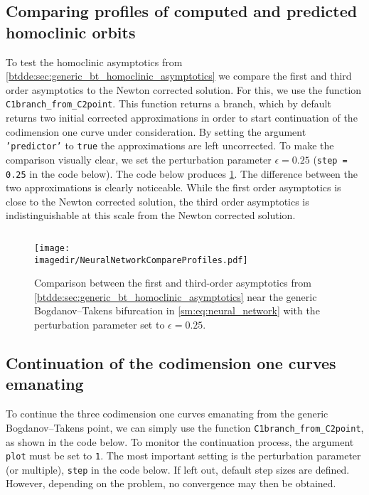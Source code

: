 \subsection{Comparing profiles of computed and predicted homoclinic orbits}
To test the homoclinic asymptotics from
\cref{btdde:sec:generic_bt_homoclinic_asymptotics} we compare the first and third
order asymptotics to the Newton corrected solution. For this, we use the 
function \texttt{C1branch_from_C2point}. This function returns a branch, which
by default returns two initial corrected approximations in order to start continuation of the
codimension one curve under consideration. By setting the argument
\texttt{'predictor'} to \texttt{true} the approximations are left uncorrected.
To make the comparison visually clear, we set the perturbation parameter 
$\epsilon=0.25$ (\texttt{step = 0.25} in the code below).
The code below produces \cref{sm:fig:NeuralNetworkCompareProfiles}.
The difference between the two approximations is clearly noticeable. While
the first order asymptotics is close to the Newton corrected solution, the third
order asymptotics is indistinguishable at this scale from the Newton corrected
solution.
\inputminted[firstline=64, lastline=82]{MATLAB}{\pathToDDEBifToolDemos/neural_network_model/neural_network_model.m}
\begin{figure}[ht!]
    \texttt{[image: \\imagedir/NeuralNetworkCompareProfiles.pdf]}
    \caption{Comparison between the first and third-order asymptotics from
    \cref{btdde:sec:generic_bt_homoclinic_asymptotics} near the generic
        Bogdanov--Takens bifurcation in \cref{sm:eq:neural_network} with the
        perturbation parameter set to $\epsilon=0.25$.}
    \label{sm:fig:NeuralNetworkCompareProfiles}
\end{figure}

\label{sm:sec:neural_network_model:continuation}
\subsection{Continuation of the codimension one curves emanating}
To continue the three codimension one curves emanating from the generic
Bogdanov--Takens point, we can simply use the function
\texttt{C1branch_from_C2point}, as shown in the code below. To monitor the
continuation process, the argument \texttt{plot} must be set to \texttt{1}.
The most important setting is the perturbation parameter (or multiple),
\texttt{step} in the code below. If left out, default step sizes are defined.
However, depending on the problem, no convergence may then be obtained.
\inputminted[firstline=84, lastline=102]{MATLAB}{\pathToDDEBifToolDemos/neural_network_model/neural_network_model.m}

